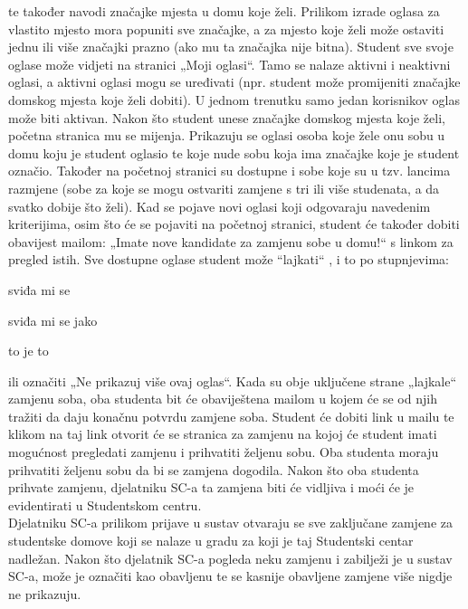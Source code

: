 te također navodi značajke mjesta u domu koje želi. Prilikom izrade oglasa za vlastito mjesto mora popuniti sve značajke, a za mjesto koje želi može ostaviti jednu ili više značajki prazno (ako mu ta značajka nije bitna). Student sve svoje oglase može vidjeti na stranici „Moji oglasi“. Tamo se nalaze aktivni i neaktivni oglasi, a aktivni oglasi mogu se uređivati (npr. student može promijeniti značajke domskog mjesta koje želi dobiti). U jednom trenutku samo jedan korisnikov oglas može biti aktivan. Nakon što student unese značajke domskog mjesta koje želi, početna stranica mu se mijenja. Prikazuju se oglasi osoba koje žele onu sobu u domu koju je student oglasio te koje nude sobu koja ima značajke koje je student označio. Također na početnoj stranici su dostupne i sobe koje su u tzv. lancima razmjene (sobe za koje se mogu ostvariti zamjene s tri ili više studenata, a da svatko dobije što želi). Kad se pojave novi oglasi koji odgovaraju navedenim kriterijima, osim što će se pojaviti na početnoj stranici, student će također dobiti obavijest mailom: „Imate nove kandidate za zamjenu sobe u domu!“ s linkom za pregled istih. Sve dostupne oglase student može “lajkati“ , i to po stupnjevima:

	\begin{packed_item}

			\item[] \begin{packed_enum}
				\item sviđa mi se
				\item sviđa mi se jako
				\item to je to
			\end{packed_enum}
			
		\end{packed_item}
		
ili označiti „Ne prikazuj više ovaj oglas“. Kada su obje uključene strane „lajkale“ zamjenu soba, oba studenta bit će obaviještena mailom u kojem će se od njih tražiti da daju konačnu potvrdu zamjene soba. Student će dobiti link u mailu te klikom na taj link otvorit će se stranica za zamjenu na kojoj će student imati mogućnost pregledati zamjenu i prihvatiti željenu sobu. Oba studenta moraju prihvatiti željenu sobu da bi se zamjena dogodila. Nakon što oba studenta prihvate zamjenu, djelatniku SC-a ta zamjena biti će vidljiva i moći će je evidentirati u Studentskom centru.\\

Djelatniku SC-a prilikom prijave u sustav otvaraju se sve zaključane zamjene za studentske domove koji se nalaze u gradu za koji je taj Studentski centar nadležan. Nakon što djelatnik SC-a pogleda neku zamjenu i zabilježi je u sustav SC-a, može je označiti kao obavljenu te se kasnije obavljene zamjene više nigdje ne prikazuju.\\


